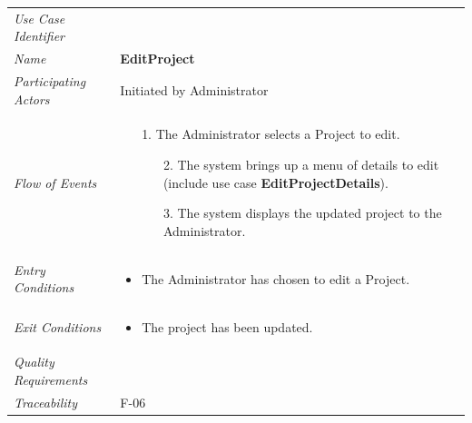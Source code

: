 \documentclass[12pt,letterpaper]{article}
\begin{document}
\begin{center}
	\begin{tabu} to 
		\toprule
		Use Case Identifier & \editproject{} \\
		Name & {\bf EditProject} \\
		Participating Actors & Initiated by Administrator \\
		Flow of Events & 
		\begin{minipage}[t]{\linewidth}
		    \begin{enumerate}
			    \item[1.] The Administrator selects a Project to edit.
			    \begin{enumerate}
			        \item[2.] The system brings up a menu of details to edit (include use case \textbf{EditProjectDetails}).
			        \item[3.] The system displays the updated project to the Administrator.
			    \end{enumerate}
			\end{enumerate}
		\end{minipage} \\

		Entry Conditions &
		\begin{minipage}[t]{\linewidth}
			\begin{itemize}
			    \item The Administrator has chosen to edit a Project.
	        \end{itemize}
		\end{minipage} \\

		Exit Conditions &
        \begin{minipage}[t]{\linewidth}
			\begin{itemize}
			    \item The project has been updated.
	        \end{itemize}
		\end{minipage} \\

		Quality Requirements & \\

		Traceability & F-06 \\
		\toprule
	\end{tabu}
\end{center}
\end{document}

